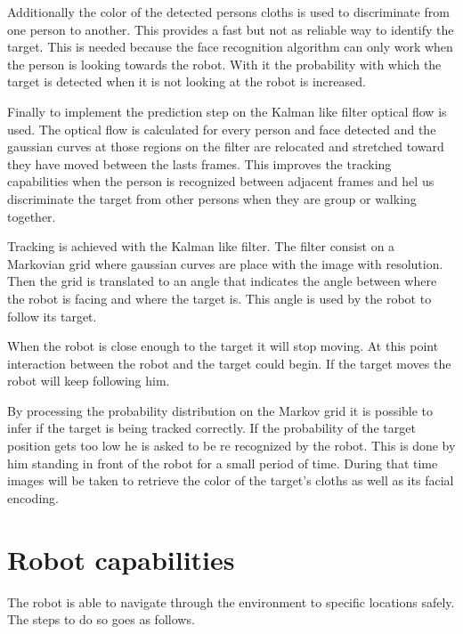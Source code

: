 Additionally the color of the detected persons cloths is used to discriminate from one person to another.
This provides a fast but not as reliable way to identify the target.
This is needed because the face recognition algorithm can only work when the person is looking towards the robot.
With it the probability with which the target is detected when it is not looking at the robot is increased.

Finally to implement the prediction step on the Kalman like filter optical flow is used.
The optical flow is calculated for every person and face detected and the gaussian curves at those regions on the filter are relocated and stretched toward they have moved between the lasts frames.
This improves the tracking capabilities when the person is recognized between adjacent frames and hel us discriminate the target from other persons when they are group or walking together.

Tracking is achieved with the Kalman like filter.
The filter consist on a Markovian grid where gaussian curves are place with the image with resolution.
Then the grid is translated to an angle that indicates the angle between where the robot is facing and where the target is.
This angle is used by the robot to follow its target.

When the robot is close enough to the target it will stop moving.
At this point interaction between the robot and the target could begin.
If the target moves the robot will keep following him.

By processing the probability distribution on the Markov grid it is possible to infer if the target is being tracked correctly.
If the probability of the target position gets too low he is asked to be re recognized by the robot.
This is done by him standing in front of the robot for a small period of time.
During that time images will be taken to retrieve the color of the target's cloths as well as its facial encoding. 

\section{Robot capabilities}
The robot is able to navigate through the environment to specific locations safely.
The steps to do so goes as follows.

